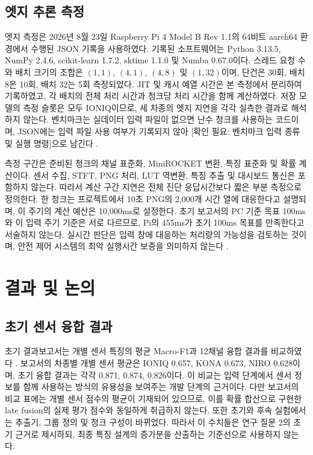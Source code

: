 \documentclass[11pt,a4paper]{article}
\newcommand{\checkneeded}[1]{\textcolor{red!65!black}{[확인 필요: #1]}}
\newcommand{\sourceproject}{\citep{project2026}}
\begin{document}
\subsection{엣지 추론 측정}
엣지 측정은 2026년 8월 23일 Raspberry Pi 4 Model B Rev 1.1의 64비트 aarch64 환경에서 수행된 JSON 기록을 사용하였다.
기록된 소프트웨어는 Python 3.13.5, NumPy 2.4.6, scikit-learn 1.7.2, sktime 1.1.0 및 Numba 0.67.0이다.
스레드 요청 수와 배치 크기의 조합은 $(1,1)$, $(4,1)$, $(4,8)$ 및 $(1,32)$이며, 단건은 30회, 배치 8은 10회, 배치 32는 5회 측정되었다.
JIT 및 캐시 예열 시간은 본 측정에서 분리하여 기록하였고, 각 배치의 전체 처리 시간과 청크당 처리 시간을 함께 계산하였다.
저장 모델의 측정 슬롯은 모두 IONIQ이므로, 세 차종의 엣지 지연을 각각 실측한 결과로 해석하지 않는다.
벤치마크는 실데이터 입력 파일이 없으면 난수 청크를 사용하는 코드이며, JSON에는 입력 파일 사용 여부가 기록되지 않아 \checkneeded{벤치마크 입력 종류 및 실행 명령}으로 남긴다 \sourceproject.

측정 구간은 준비된 청크의 채널 표준화, MiniROCKET 변환, 특징 표준화 및 확률 계산이다.
센서 수집, STFT, PNG 처리, LUT 역변환, 특징 추출 및 대시보드 통신은 포함하지 않는다.
따라서 계산 구간 지연은 전체 진단 응답시간보다 짧은 부분 측정으로 정의한다.
한 청크는 프로젝트에서 10초 PNG의 2,000개 시간 열에 대응한다고 설명되며, 이 주기의 계산 예산은 10,000ms로 설정한다.
초기 보고서의 PC 기준 목표 100ms와 이 입력 주기 기준은 서로 다르므로, Pi의 455ms가 초기 100ms 목표를 만족한다고 서술하지 않는다.
실시간 판단은 입력 창에 대응하는 처리량의 가능성을 검토하는 것이며, 안전 제어 시스템의 최악 실행시간 보증을 의미하지 않는다 \sourceproject.

\section{결과 및 논의}
\subsection{초기 센서 융합 결과}
초기 결과보고서는 개별 센서 특징의 평균 Macro-F1과 12채널 융합 결과를 비교하였다 \sourceproject.
보고서의 차종별 개별 센서 평균은 IONIQ 0.657, KONA 0.673, NIRO 0.628이며, 초기 융합 결과는 각각 0.871, 0.874, 0.826이다.
이 비교는 입력 단계에서 센서 정보를 함께 사용하는 방식의 유용성을 보여주는 개발 단계의 근거이다.
다만 보고서의 비교 표에는 개별 센서 점수의 평균이 기재되어 있으므로, 이를 확률 합산으로 구현한 late fusion의 실제 평가 점수와 동일하게 취급하지 않는다.
또한 초기와 후속 실험에서는 추출기, 그룹 정의 및 청크 구성이 바뀌었다.
따라서 이 수치들은 연구 질문 2의 초기 근거로 제시하되, 최종 특징 설계의 증가분을 산출하는 기준선으로 사용하지 않는다.
\end{document}
